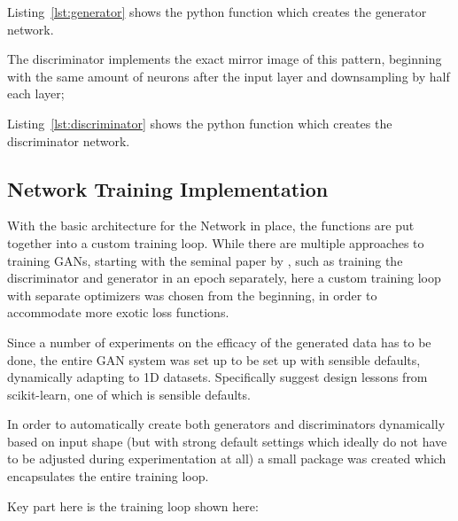 
Listing~\ref{lst:generator} shows the python function which creates the generator network.

\pagebreak 

The discriminator implements the exact mirror image of this pattern, beginning with the same amount of neurons after the input layer and downsampling by half each layer; 


Listing~\ref{lst:discriminator} shows the python function which creates the discriminator network.

\pagebreak 

\subsection{Network Training Implementation}
\label{subsection:training_loop}

With the basic architecture for the Network in place, the functions are put together into a custom training loop. While there are multiple approaches to training \acp{GAN}, starting with the seminal paper by \cite{goodfellow2014generative}, such as training the discriminator and generator in an epoch separately, here a custom training loop with separate optimizers was chosen from the beginning, in order to accommodate more exotic loss functions.

Since a number of experiments on the efficacy of the generated data has to be done, the entire \ac{GAN} system was set up to be set up with sensible defaults, dynamically adapting to 1D datasets. 
Specifically \cite{buitinck2013api} suggest design lessons from scikit-learn, one of which is sensible defaults.

In order to automatically create both generators and discriminators dynamically based on input shape (but with strong default settings which ideally do not have to be adjusted during experimentation at all) a small package was created which encapsulates the entire training loop.

Key part here is the training loop shown here:

\newpage



